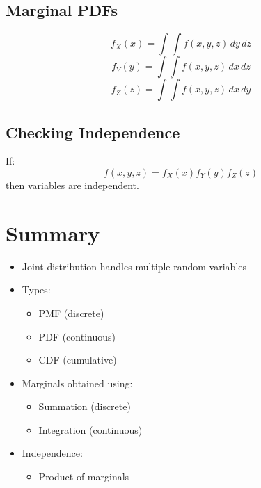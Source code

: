 \documentclass[12pt]{article}
\begin{document}
\subsection*{Marginal PDFs}
\[
f_X(x) = \int \int f(x,y,z)\, dy\, dz
\]
\[
f_Y(y) = \int \int f(x,y,z)\, dx\, dz
\]
\[
f_Z(z) = \int \int f(x,y,z)\, dx\, dy
\]

\subsection*{Checking Independence}
If:
\[
f(x,y,z) = f_X(x)f_Y(y)f_Z(z)
\]
then variables are independent.

\section*{Summary}

\begin{itemize}
    \item Joint distribution handles multiple random variables
    \item Types:
    \begin{itemize}
        \item PMF (discrete)
        \item PDF (continuous)
        \item CDF (cumulative)
    \end{itemize}
    \item Marginals obtained using:
    \begin{itemize}
        \item Summation (discrete)
        \item Integration (continuous)
    \end{itemize}
    \item Independence:
    \begin{itemize}
        \item Product of marginals
    \end{itemize}
\end{itemize}
\end{document}
